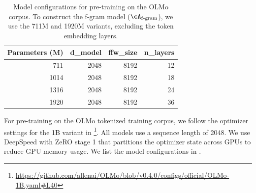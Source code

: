 \begin{table}[h]
    \centering
    \begin{tabular}{r|r r r}
        \toprule
        \textbf{Parameters (M)} & \textbf{d\_model} & \textbf{ffw\_size} & \textbf{n\_layers} \\
        \midrule
         711 &  2048  &  8192  &  12   \\
        1014  &  2048   &  8192  &  18     \\
        1316  &   2048 &  8192   &  24     \\
        1920  &  2048  &  8192  &  36     \\
        \bottomrule
    \end{tabular}
    \caption{Model configurations for pre-training on the OLMo corpus. To construct the f-gram model ($\Afgram$), we use the 711M and 1920M variants, excluding the token embedding layers.}
    \label{tab:olmo_model_configs}
\end{table}


For pre-training on the OLMo tokenized training corpus, we follow the optimizer settings for the 1B variant in \citet{OLMo} \footnote{\url{https://github.com/allenai/OLMo/blob/v0.4.0/configs/official/OLMo-1B.yaml\#L40}}. All models use a sequence length of 2048. We use DeepSpeed \citep{deepspeed_repo} with ZeRO stage 1 that partitions the optimizer state across GPUs to reduce GPU memory usage. We list the model configurations in .

